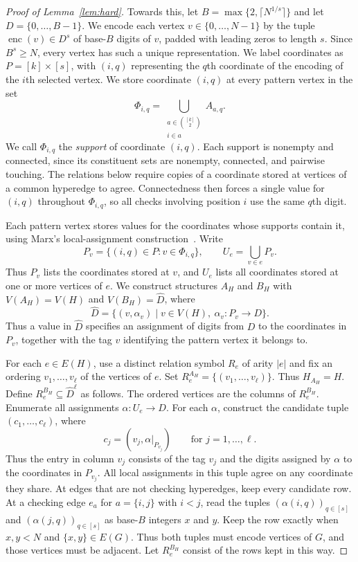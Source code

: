 \documentclass[11pt,letterpaper]{article}
\theoremstyle{definition}
\theoremstyle{remark}
\begin{document}
\begin{proof}[Proof of Lemma~\ref{lem:hard}]
Towards this, let $B=\max\{2,\lceil N^{1/s}\rceil\}$ and let $D=\{0,\ldots,B-1\}$. We encode each vertex $v\in\{0,\ldots,N-1\}$ by the tuple $\operatorname{enc}(v)\in D^s$ of base-$B$ digits of $v$, padded
with leading zeros to length $s$. Since $B^s\ge N$, every vertex has such a unique representation.
We label coordinates as $P=[k]\times[s]$, with $(i,q)$ representing
the $q$th coordinate of the encoding of the $i$th selected vertex.
We store coordinate $(i,q)$ at every pattern vertex in the set
\[
 \Phi_{i,q}=\bigcup_{\substack{a\in\binom{[k]}{2}\\i\in a}}A_{a,q}.
\]
We call $\Phi_{i,q}$ the \emph{support} of coordinate $(i,q)$.
Each support is nonempty and connected, since its constituent sets
are nonempty, connected, and pairwise touching.
The relations below require copies of a coordinate stored at vertices
of a common hyperedge to agree. Connectedness then forces a single value
for $(i,q)$ throughout $\Phi_{i,q}$, so all checks involving position $i$
use the same $q$th digit.


Each pattern vertex stores values for the coordinates whose supports
contain it, using Marx's local-assignment
construction~\cite[Lemma 7.5 and Remark 7.6]{Marx13}. Write
\[
 P_v=\{(i,q)\in P:v\in\Phi_{i,q}\},\qquad
 U_e=\bigcup_{v\in e}P_v.
\]
Thus $P_v$ lists the coordinates stored at $v$, and $U_e$ lists all
coordinates stored at one or more vertices of $e$. We construct structures
$A_H$ and $B_H$ with $V(A_H)=V(H)$ and $V(B_H)=\widehat D$, where
\[
 \widehat D=\{(v,\alpha_v)\mid v\in V(H),\ \alpha_v:P_v\to D\}.
\]
Thus a value in $\widehat D$ specifies an assignment of digits from $D$
to the coordinates in $P_v$, together with the tag $v$ identifying
the pattern vertex it belongs to.

%
%
%

For each $e\in E(H)$, use a distinct relation symbol $R_e$ of arity
$|e|$ and fix an ordering $v_1,\ldots,v_\ell$ of the vertices of $e$.
Set $R_e^{A_H}=\{(v_1,\ldots,v_\ell)\}$. Thus $H_{A_H}=H$.
Define $R_e^{B_H}\subseteq\widehat D^\ell$ as follows.
The ordered vertices are the columns of $R_e^{B_H}$.
Enumerate all assignments $\alpha:U_e\to D$.
For each $\alpha$, construct the candidate tuple $(c_1,\ldots,c_\ell)$, where
\[
 c_j=(v_j,\alpha|_{P_{v_j}})\qquad\text{for }j=1,\ldots,\ell.
\]
Thus the entry in column $v_j$ consists of the tag $v_j$ and the digits
assigned by $\alpha$ to the coordinates in $P_{v_j}$.
All local assignments in this tuple agree on any coordinate they share.
At edges that are not checking hyperedges, keep every candidate row.
At a checking edge $e_a$ for $a=\{i,j\}$ with $i<j$, read the tuples
$(\alpha(i,q))_{q\in[s]}$ and $(\alpha(j,q))_{q\in[s]}$ as base-$B$
integers $x$ and $y$. Keep the row exactly when $x,y<N$ and
$\{x,y\}\in E(G)$. Thus both tuples must encode vertices of $G$,
and those vertices must be adjacent. Let $R_e^{B_H}$ consist of the rows
kept in this way.



\end{proof}
\end{document}
